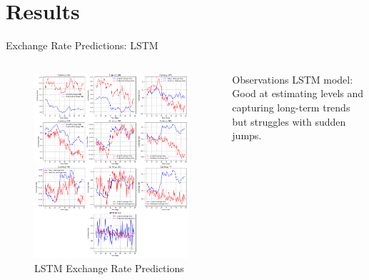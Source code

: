 \documentclass{beamer}
\begin{document}
\section{Results}

\begin{frame}{Exchange Rate Predictions: LSTM}
    \begin{columns}[T,onlytextwidth]
        \begin{figure}[ht]
            \centering
            \includegraphics[width=\textwidth]{figure/lstm_exchange_rate_predictions.png}
            \caption{LSTM Exchange Rate Predictions}
            \label{figure:lstm_predictions}
        \end{figure}

        \begin{block}{Observations}
            LSTM model: Good at estimating levels and capturing long-term trends but struggles with sudden jumps.
        \end{block}
    \end{columns}
\end{frame}
\end{document}
